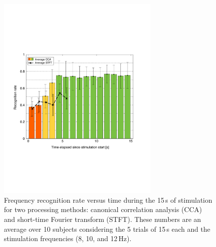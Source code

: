 \documentclass[smallextended]{svjour3}
\begin{document}
\begin{figure}
\center
\includegraphics[width=0.7\textwidth]{figures/all_time_reconn.pdf}
\caption{Frequency recognition rate versus time during the 15\,s of stimulation for two processing methods: canonical correlation analysis (CCA) and short-time Fourier transform (STFT). These numbers are an average over 10 subjects considering the 5 trials of 15\,s each and the stimulation frequencies (8, 10, and 12\,Hz).} \label{fig:all_time_reconn}
\end{figure}
\end{document}
